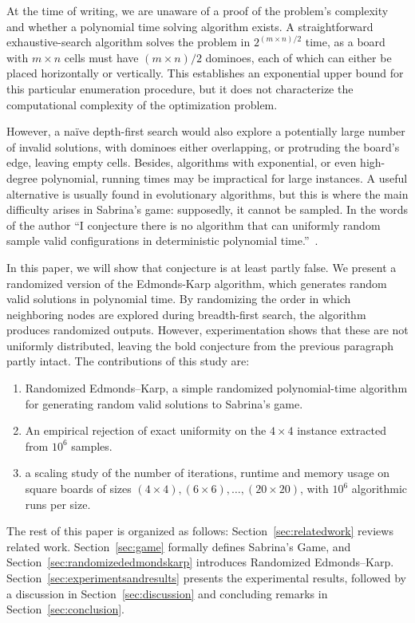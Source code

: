 \documentclass[svgnames,table,runningheads]{llncs}
\begin{document}
At the time of writing, we are unaware of a proof of the problem's complexity and whether a polynomial time solving algorithm exists. A straightforward exhaustive-search algorithm solves the problem in $2^{(m \times n)/2}$ time, as a board with $m \times n$ cells must have $(m \times n)/2$ dominoes, each of which can either be placed horizontally or vertically. This establishes an exponential upper bound for this particular enumeration procedure, but it does not characterize the computational complexity of the optimization problem.

However, a naïve depth-first search would also explore a potentially large number of invalid solutions, with dominoes either overlapping, or protruding the board's edge, leaving empty cells. Besides, algorithms  with exponential, or even high-degree polynomial, running times may be impractical for large instances. A useful alternative is usually found in evolutionary algorithms, but this is where the main difficulty arises in Sabrina's game: supposedly, it cannot be sampled. In the words of the author ``I conjecture there is no algorithm that can uniformly random sample valid configurations in deterministic polynomial time.''~\cite{SabrinasGame2026}.

In this paper, we will show that conjecture is at least partly false. We present a randomized version of the Edmonds-Karp algorithm, which generates random valid solutions in polynomial time. By randomizing the order in which neighboring nodes are explored during breadth-first search, the algorithm produces randomized outputs. However, experimentation shows that these are not uniformly distributed, leaving the bold conjecture from the previous paragraph partly intact. The contributions of this study are:

\begin{enumerate}
  \item Randomized Edmonds--Karp, a simple randomized polynomial-time algorithm for generating random valid solutions to Sabrina's game.
  \item An empirical rejection of exact uniformity on the $4\times4$ instance extracted from $10^6$ samples.
  \item a scaling study of the number of iterations, runtime and memory usage on square boards of sizes $(4\times4), (6\times6), \ldots, (20\times20)$, with $10^6$ algorithmic runs per size.
\end{enumerate}

\noindent The rest of this paper is organized as follows: Section~\ref{sec:relatedwork} reviews related work. Section~\ref{sec:game} formally defines Sabrina’s Game, and Section~\ref{sec:randomizededmondskarp} introduces Randomized Edmonds–Karp. Section~\ref{sec:experimentsandresults} presents the experimental results, followed by a discussion in Section~\ref{sec:discussion} and concluding remarks in Section~\ref{sec:conclusion}.
\end{document}
